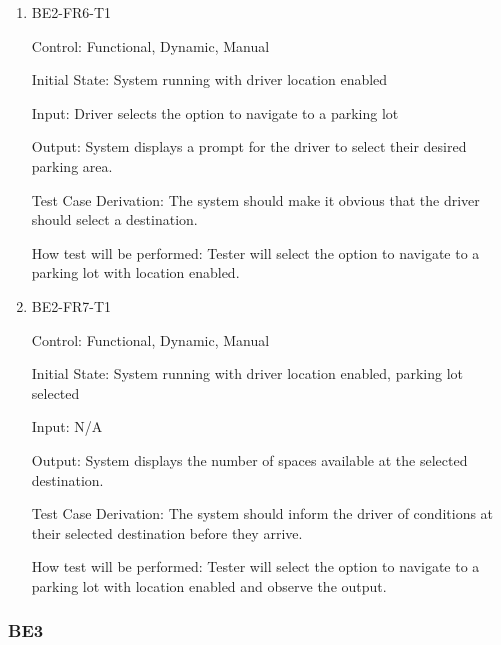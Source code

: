 \documentclass[12pt, titlepage]{article}
\begin{document}
\begin{enumerate}
\item{BE2-FR6-T1}

Control: Functional, Dynamic, Manual
					
Initial State: System running with driver location enabled
					
Input: Driver selects the option to navigate to a parking lot
					
Output: System displays a prompt for the driver to select their desired parking
area.

Test Case Derivation: The system should make it obvious that the driver should
select a destination.
					
How test will be performed: Tester will select the option to navigate to a
parking lot with location enabled.

\item{BE2-FR7-T1}

Control: Functional, Dynamic, Manual
					
Initial State: System running with driver location enabled, parking lot selected
					
Input: N/A
					
Output: System displays the number of spaces available at the selected
destination.

Test Case Derivation: The system should inform the driver of conditions at their
selected destination before they arrive.
					
How test will be performed: Tester will select the option to navigate to a
parking lot with location enabled and observe the output.

\end{enumerate}

\subsubsection{BE3}
\end{document}
